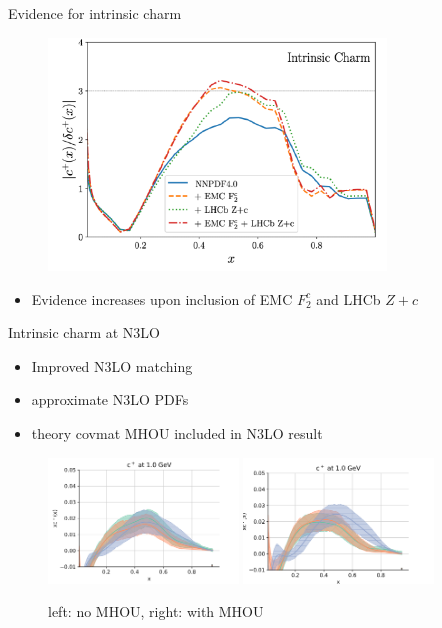 \documentclass[aspectratio=43, 8pt,t]{beamer}
\begin{document}
\begin{frame}{Evidence for intrinsic charm}
  \begin{figure}
    \includegraphics[width=0.8\textwidth]{ic_f2c_zc.png}
  \end{figure}
  \begin{itemize}
    \item Evidence increases upon inclusion of EMC $F_2^c$ and LHCb $Z+c$
  \end{itemize}
\end{frame}

\begin{frame}{Intrinsic charm at N3LO}
  \begin{itemize}
    \item Improved N3LO matching
    \item approximate N3LO PDFs
    \item theory covmat MHOU included in N3LO result
  \end{itemize}
  \begin{figure}
    \includegraphics[width=0.45\textwidth]{n3lo_charm.png}
    \includegraphics[width=0.45\textwidth]{n3lo_charm_mhou.png}
    \caption*{left: no MHOU, right: with MHOU}
  \end{figure}
\end{frame}
\end{document}
